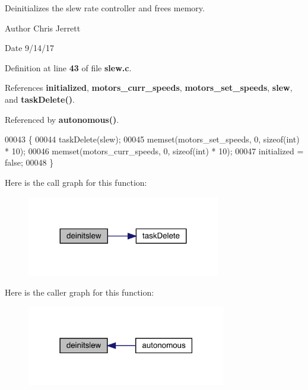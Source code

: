 Deinitializes the slew rate controller and frees memory. 

\begin{DoxyAuthor}{Author}
Chris Jerrett 
\end{DoxyAuthor}
\begin{DoxyDate}{Date}
9/14/17 
\end{DoxyDate}


Definition at line \textbf{ 43} of file \textbf{ slew.\+c}.



References \textbf{ initialized}, \textbf{ motors\+\_\+curr\+\_\+speeds}, \textbf{ motors\+\_\+set\+\_\+speeds}, \textbf{ slew}, and \textbf{ task\+Delete()}.



Referenced by \textbf{ autonomous()}.


\begin{DoxyCode}
00043                  \{
00044   taskDelete(slew);
00045   memset(motors_set_speeds, 0, \textcolor{keyword}{sizeof}(\textcolor{keywordtype}{int}) * 10);
00046   memset(motors_curr_speeds, 0, \textcolor{keyword}{sizeof}(\textcolor{keywordtype}{int}) * 10);
00047   initialized = \textcolor{keyword}{false};
00048 \}
\end{DoxyCode}
Here is the call graph for this function\+:\nopagebreak
\begin{figure}[H]
\begin{center}
\leavevmode
\includegraphics[width=239pt]{slew_8h_a981c9990a969d2587e66e550737f7cd9_cgraph}
\end{center}
\end{figure}
Here is the caller graph for this function\+:\nopagebreak
\begin{figure}[H]
\begin{center}
\leavevmode
\includegraphics[width=247pt]{slew_8h_a981c9990a969d2587e66e550737f7cd9_icgraph}
\end{center}
\end{figure}
\mbox{\label{slew_8h_a321758941d88b75783955c819bb75005}} 
